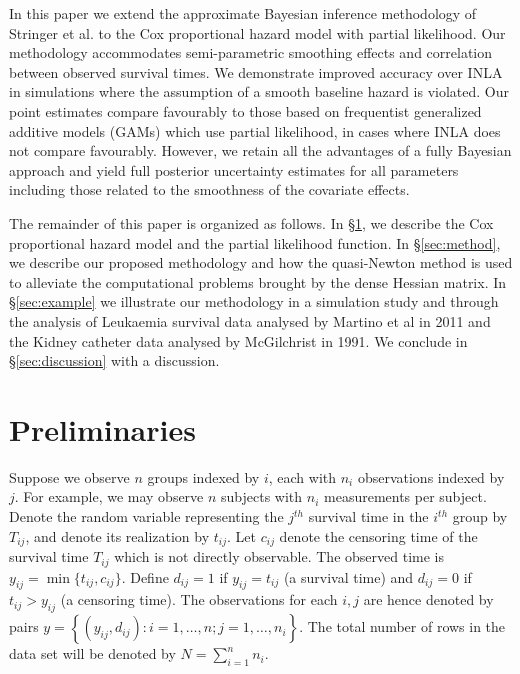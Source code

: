 \documentclass[AMA,STIX1COL,doublespace]{WileyNJD-v2}
\begin{document}
In this paper we extend the approximate Bayesian inference methodology of Stringer et al. \cite{casecross} to the Cox proportional hazard model with partial likelihood. Our methodology accommodates semi-parametric smoothing effects and correlation between observed survival times. We demonstrate improved accuracy over INLA in simulations where the assumption of a smooth baseline hazard is violated. Our point estimates compare favourably to those based on frequentist generalized additive models (GAMs) which use partial likelihood, in cases where INLA does not compare favourably. However, we retain all the advantages of a fully Bayesian approach and yield full posterior uncertainty estimates for all parameters including those related to the smoothness of the covariate effects.

The remainder of this paper is organized as follows. In \S\ref{sec:prelim}, we describe the Cox proportional hazard model and the partial likelihood function. In \S\ref{sec:method}, we describe our proposed methodology and how the quasi-Newton method is used to alleviate the computational problems brought by the dense Hessian matrix. In \S\ref{sec:example} we illustrate our methodology in a simulation study and through the analysis of Leukaemia survival data analysed by Martino et al in 2011 \citep{inlacoxph} and the Kidney catheter data analysed by McGilchrist \citep{kidney} in 1991. We conclude in \S\ref{sec:discussion} with a discussion.

\section{Preliminaries}\label{sec:prelim}

Suppose we observe $n$ groups indexed by $i$, each with $n_{i}$ observations indexed by $j$. For example, we may observe $n$ subjects with $n_{i}$ measurements per subject. Denote the random variable representing the $j^{th}$ survival time in the $i^{th}$ group by $T_{ij}$, and denote its realization by $t_{ij}$. Let $c_{ij}$ denote the censoring time of the survival time $T_{ij}$ which is not directly observable. The observed time is $y_{ij} = \min\{t_{ij},c_{ij}\}$. Define $d_{ij} = 1$ if $y_{ij} = t_{ij}$ (a survival time) and $d_{ij} = 0$ if $t_{ij} > y_{ij}$ (a censoring time). The observations for each $i,j$ are hence denoted by pairs $y =  \left\{(y_{ij},d_{ij}): i = 1,\ldots,n; j = 1,\ldots,n_{i} \right\}$. The total number of rows in the data set will be denoted by $N = \sum_{i=1}^{n}n_{i}$.
\end{document}
